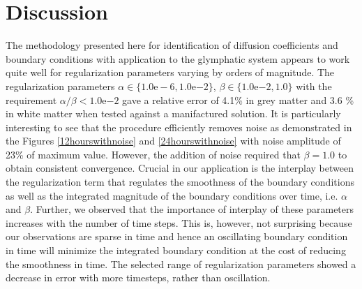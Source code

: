 \documentclass[11pt,a4paper]{article}
\begin{document}
%
% 

\section{Discussion}
The methodology presented here for identification of diffusion coefficients and boundary conditions with application to the glymphatic system appears to work quite 
well for regularization parameters varying by orders of magnitude. The regularization parameters  $\alpha \in \lbrace 1.0\mathrm{e-6}, 1.0\mathrm{e}{-2} \rbrace$, $\beta \in \lbrace 1.0\mathrm{e}{-2} , 1.0 \rbrace$ with the requirement $\alpha / \beta < 1.0\mathrm{e}{-2}$ gave a relative error of  
4.1\% in grey matter and 3.6 \% in white matter when tested against a manifactured solution. It is particularly interesting to see that the procedure efficiently removes noise as demonstrated
in the Figures \ref{12hourswithnoise} and \ref{24hourswithnoise} with noise amplitude of 23\% of maximum value. However, the addition of noise required that $\beta = 1.0 $ to obtain consistent convergence. 
Crucial in our application is the interplay between the regularization term that regulates the smoothness of the boundary conditions as well as the integrated magnitude of the boundary conditions over time, i.e. $\alpha$ and $\beta$. Further, we observed that the importance of interplay of these parameters increases with the number of time steps. This is, however, not surprising because our observations are sparse
in time and hence an oscillating boundary condition in time will minimize the integrated boundary condition at the cost of reducing the smoothness in time. The selected range of regularization parameters showed a decrease in error with more timesteps, rather than oscillation.     
\end{document}
